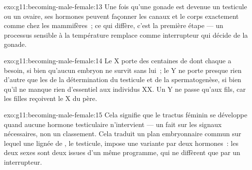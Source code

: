 \begin{solution}{exo:g11:becoming-male-female:13}
Une fois qu'une gonade est devenue un testicule ou un ovaire, ses
hormones peuvent façonner les canaux et le corps exactement comme chez
les mammifères~; ce qui diffère, c'est la première étape --- un
processus sensible à la température remplace  comme interrupteur qui
décide de la gonade.
\end{solution}

\begin{solution}{exo:g11:becoming-male-female:14}
Le X porte des centaines de  dont chaque  a besoin, si bien
qu'aucun embryon ne survit sans lui~; le Y ne porte presque rien
d'autre que les  de la détermination du testicule et de la
spermatogenèse, si bien qu'il ne manque rien d'essentiel aux individus
XX. Un Y ne passe qu'aux fils, car les filles reçoivent le X du père.
\end{solution}

\begin{solution}{exo:g11:becoming-male-female:15}
Cela signifie que le tractus féminin se développe quand aucune hormone
testiculaire n'intervient --- un fait sur les signaux nécessaires, non
un classement. Cela traduit un plan embryonnaire commun sur lequel une
lignée de , le testicule, impose une variante par deux
hormones~: les deux sexes sont deux issues d'un même programme, qui ne
diffèrent que par un interrupteur.
\end{solution}

